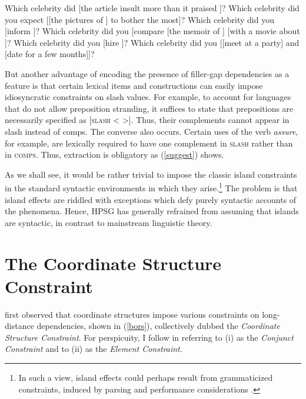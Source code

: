 \documentclass[output=paper
	        ,collection
	        ,collectionchapter
 	        ,biblatex
                ,babelshorthands
                ,newtxmath
                ,draftmode
                ,colorlinks, citecolor=brown
]{langscibook}
\begin{document}
\eal  \label{cc5}
\ex Which celebrity did  [the article insult \spc more than it praised \spc]?
\ex  Which celebrity  did you expect [[the pictures of \spc ] to bother \spc the most]?
\ex Which celebrity did you [inform ]?
\ex Which celebrity did you [compare [the memoir of \spc] [with a movie about \spc]?
\ex Which celebrity  did you [hire ]?
\ex Which celebrity  did you [[meet \spcs at a party] and [date \spcs for a few months]]?
\zl 

But another advantage of encoding the presence of filler-gap dependencies as a feature is that
certain lexical items and constructions can easily impose idiosyncratic constraints on {\sc slash}
values. For example, to account for  languages that do not allow preposition stranding,
it suffices to state that prepositions are necessarily specified as [\textsc{slash} < >]. Thus,
their complements cannot appear in {\sc slash} instead of {\sc comps}. 
The converse also occurs. Certain uses of the verb \emph{assure}, for example, 
are lexically required to have one complement in \textsc{slash} rather
   than in \textsc{comps}. Thus, extraction is obligatory as (\ref{suggest}) shows.
   
\eal \label{suggest}   
\zl

As we shall see, it would be rather trivial to impose the classic island constraints in the standard syntactic
environments in which they arise.\footnote{In such a view, island effects could perhaps result from
grammaticized constraints, induced by parsing and performance considerations  
\citep{prichett,fodor78,Fodor83}.}
 The problem is that island effects are riddled with exceptions which
defy purely syntactic accounts of the phenomena.  Hence, HPSG has generally refrained from
assuming that islands are syntactic, in contrast to mainstream linguistic theory.


\section{The Coordinate Structure Constraint}

\citet{Ross67} first observed that coordinate structures
impose various constraints on long-distance dependencies, shown in  (\ref{bors}), collectively dubbed the
\emph{Coordinate Structure Constraint}. For perspicuity,  I  follow \citet{grosu73} in referring to (i) as the \emph{Conjunct Constraint} and to (ii) as the \emph{Element Constraint}.
\end{document}
